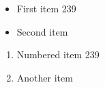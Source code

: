 \documentclass{article}
\begin{document}
\begin{itemize}
\item First item 239
\item Second item
\end{itemize}
\begin{enumerate}
\item Numbered item 239
\item Another item
\end{enumerate}
\end{document}
